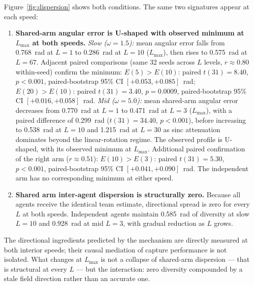 \documentclass[sigconf,anonymous]{aamas}
\newcommand{\Lmax}{L_{\max}}
\begin{document}
Figure~\ref{fig:dispersion} shows both conditions.  The same two
signatures appear at each speed:

\begin{enumerate}
  \item \textbf{Shared-arm angular error is U-shaped with observed minimum at $\Lmax$ at both speeds.}
  \emph{Slow ($\omega{=}1.5$):} mean angular error falls from
  0.768~rad at $L{=}1$ to 0.286~rad at $L{=}10$ ($\Lmax$), then rises
  to 0.575~rad at $L{=}67$.
  Adjacent paired comparisons (same 32 seeds across $L$ levels,
  $r{\approx}0.80$ within-seed) confirm the minimum:
  $E(5){>}E(10)$: paired $t(31){=}8.40$, $p{<}0.001$,
  paired-bootstrap 95\% CI $[{+}0.053,{+}0.085]$~rad;
  $E(20){>}E(10)$: paired $t(31){=}3.40$, $p{=}0.0009$,
  paired-bootstrap 95\% CI $[{+}0.016,{+}0.058]$~rad.
  \emph{Mid ($\omega{=}5.0$):} mean shared-arm angular error decreases from
  0.770~rad at $L{=}1$ to 0.471~rad at $L{=}3$ ($\Lmax$), with a paired
  difference of 0.299~rad ($t(31){=}34.40$, $p{<}0.001$), before
  increasing to 0.538~rad at $L{=}10$ and 1.215~rad at $L{=}30$ as
  sinc attenuation dominates beyond the linear-rotation regime.
  The observed profile is U-shaped, with its observed minimum at $\Lmax$.
  Additional paired confirmation of the right arm ($r{\approx}0.51$):
  $E(10){>}E(3)$: paired $t(31){=}5.30$, $p{<}0.001$,
  paired-bootstrap 95\% CI $[{+}0.041,{+}0.090]$~rad.
  The independent arm has no corresponding minimum at either speed.

  \item \textbf{Shared arm inter-agent dispersion is structurally zero.}
  Because all agents receive the identical team estimate,
  directional spread is zero for every $L$ at both speeds.
  Independent agents maintain 0.585~rad of diversity at slow $L{=}10$
  and 0.928~rad at mid $L{=}3$, with gradual reduction as $L$ grows.
\end{enumerate}

The directional ingredients predicted by the mechanism are directly
measured at both interior speeds; their causal mediation of capture
performance is not isolated.  What changes at $\Lmax$ is not a
collapse of shared-arm dispersion — that is structural at every $L$
— but the interaction: zero diversity compounded by a stale field
direction rather than an accurate one.
\end{document}
